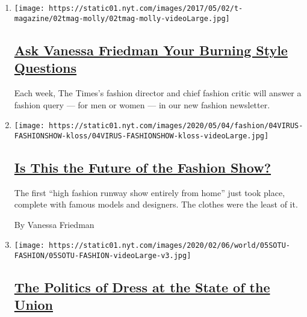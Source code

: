 \begin{enumerate}
\def\labelenumi{\arabic{enumi}.}
\item
  \texttt{[image: https://static01.nyt.com/images/2017/05/02/t-magazine/02tmag-molly/02tmag-molly-videoLarge.jpg]}

  \hypertarget{ask-vanessa-friedman-your-burning-style-questions}{%
  \subsection{\texorpdfstring{\href{/2017/05/03/fashion/style-questions-newsletter-open-thread.html}{Ask
  Vanessa Friedman Your Burning Style
  Questions}}{Ask Vanessa Friedman Your Burning Style Questions}}\label{ask-vanessa-friedman-your-burning-style-questions}}

  Each week, The Times's fashion director and chief fashion critic will
  answer a fashion query --- for men or women --- in our new fashion
  newsletter.
\item
  \texttt{[image: https://static01.nyt.com/images/2020/05/04/fashion/04VIRUS-FASHIONSHOW-kloss/04VIRUS-FASHIONSHOW-kloss-videoLarge.jpg]}

  \hypertarget{is-this-the-future-of-the-fashion-show}{%
  \subsection{\texorpdfstring{\href{/2020/05/02/fashion/coronavirus-digital-fashion-show.html}{Is
  This the Future of the Fashion
  Show?}}{Is This the Future of the Fashion Show?}}\label{is-this-the-future-of-the-fashion-show}}

  The first ``high fashion runway show entirely from home'' just took
  place, complete with famous models and designers. The clothes were the
  least of it.

  By Vanessa Friedman
\item
  \texttt{[image: https://static01.nyt.com/images/2020/02/06/world/05SOTU-FASHION/05SOTU-FASHION-videoLarge-v3.jpg]}

  \hypertarget{the-politics-of-dress-at-the-state-of-the-union}{%
  \subsection{\texorpdfstring{\href{/2020/02/05/style/melanie-trump-congresswomen-in-white-state-of-the-union.html}{The
  Politics of Dress at the State of the
  Union}}{The Politics of Dress at the State of the Union}}\label{the-politics-of-dress-at-the-state-of-the-union}}


\end{enumerate}
